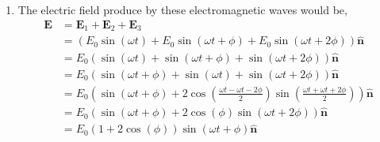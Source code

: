 \documentclass{article}
\begin{document}
\begin{problem}[Intensity]
\begin{enumerate}
	\item The electric field produce by these electromagnetic waves would be,
	      \begin{align*}
		      \mathbf{E} & = \mathbf{E}_1+\mathbf{E}_2+\mathbf{E}_3                                                                                                                                     \\
		                 & = \left(E_0\sin{\left(\omega t\right)}+E_0\sin{\left(\omega t+\phi\right)}+E_0\sin{\left(\omega t+2\phi\right)}\right)\hat{\mathbf{n}}                                       \\
		                 & = E_0\left(\sin{\left(\omega t\right)}+\sin{\left(\omega t+\phi\right)}+\sin{\left(\omega t+2\phi\right)}\right)\hat{\mathbf{n}}                                             \\
		                 & = E_0\left(\sin{\left(\omega t+\phi\right)}+\sin{\left(\omega t\right)}+\sin{\left(\omega t+2\phi\right)}\right)\hat{\mathbf{n}}                                             \\
		                 & = E_0\left(\sin{\left(\omega t+\phi\right)}+2\cos{\left(\frac{\omega t-\omega t-2\phi}{2}\right)}\sin{\left(\frac{\omega t+\omega t+2\phi}{2}\right)}\right)\hat{\mathbf{n}} \\
		                 & = E_0\left(\sin{\left(\omega t+\phi\right)}+2\cos{\left(\phi\right)}\sin{\left(\omega t+2\phi\right)}\right)\hat{\mathbf{n}}                                                 \\
		                 & = E_0\left(1+2\cos{\left(\phi\right)}\right)\sin{\left(\omega t+\phi\right)}\hat{\mathbf{n}}
	      \end{align*}


\end{enumerate}
\end{problem}
\end{document}
